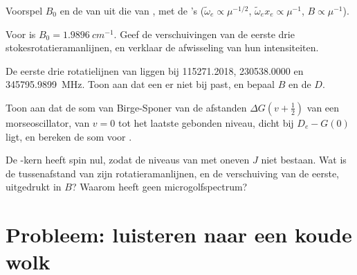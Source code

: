 \begin{exercise}[$\star\star$]\label{exo:b3:rovibrational-spectroscopy:8}
Voorspel $B_0$ en de  van  uit die van , met
de 's ($\tilde\omega_e \propto \mu^{-1/2}$, $\tilde\omega_ex_e \propto
\mu^{-1}$, $B \propto \mu^{-1}$).
\end{exercise}

\begin{exercise}[$\star\star$]\label{exo:b3:rovibrational-spectroscopy:9}
Voor  is $B_0 = \qty{1.9896}{cm^{-1}}$. Geef de verschuivingen van
de eerste drie stokesrotatieramanlijnen, en verklaar de afwisseling van
hun intensiteiten.
\end{exercise}

\begin{exercise}[$\star\star\star$]\label{exo:b3:rovibrational-spectroscopy:10}
De eerste drie rotatielijnen van  liggen bij 115271.2018,
230538.0000 en \qty{345795.9899}{MHz}. Toon aan dat een  er
niet bij past, en bepaal $B$ en de  $D$.
\end{exercise}

\begin{exercise}[$\star\star\star$]\label{exo:b3:rovibrational-spectroscopy:11}
Toon aan dat de som van Birge-Sponer van de afstanden $\Delta G(v + \frac12)$ van een
morseoscillator, van $v = 0$ tot het laatste gebonden niveau, dicht bij
$D_e - G(0)$ ligt, en bereken de som voor .
\end{exercise}

\begin{exercise}[$\star\star\star$]\label{exo:b3:rovibrational-spectroscopy:12}
De -kern heeft spin nul, zodat de niveaus van  met oneven
$J$ niet bestaan. Wat is de tussenafstand van zijn rotatieramanlijnen, en
de verschuiving van de eerste, uitgedrukt in $B$? Waarom heeft  geen
microgolfspectrum?
\end{exercise}

\section{Probleem: luisteren naar een koude wolk}


